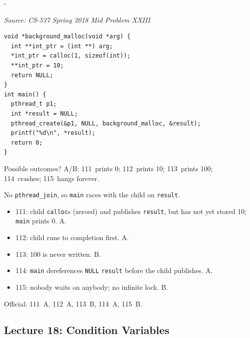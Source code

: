 \documentclass[11pt,a4paper]{article}
\makeatletter
\newcommand{\keepspace}[1]{\par\penalty-100\begingroup
  \setlength{\dimen@}{#1}\dimen@ii\pagegoal\advance\dimen@ii-\pagetotal
  \ifdim\dimen@>\dimen@ii\ifdim\dimen@ii>\z@\vfil\fi\break\fi\endgroup}
\newcounter{qn}[section]
\newenvironment{Qn}[4]{%
  \refstepcounter{qn}\keepspace{7\baselineskip}%
  \begin{tcolorbox}[qboxstyle, title={Q\thesection.\theqn\ \ [#1 \textbar\ #2]\ \ #4}]%
  {\footnotesize\color{g3}\textit{Source: #3}}\par\smallskip%
}{%
  \end{tcolorbox}%
}
\newenvironment{Sol}{%
  \begin{tcolorbox}[sboxstyle, title={Solution}]%
}{%
  \end{tcolorbox}\vspace{0.35em}%
}
\makeatother
\begin{document}
\begin{Qn}{Medium-Hard}{Lect 16}{CS-537 Spring 2018 Mid Problem XXIII}{Background \texttt{calloc} without a join}
\begin{lstlisting}[numbers=none]
void *background_malloc(void *arg) {
  int **int_ptr = (int **) arg;
  *int_ptr = calloc(1, sizeof(int));
  **int_ptr = 10;
  return NULL;
}
int main() {
  pthread_t p1;
  int *result = NULL;
  pthread_create(&p1, NULL, background_malloc, &result);
  printf("%d\n", *result);
  return 0;
}
\end{lstlisting}

Possible outcomes? A/B: 111~prints 0; 112~prints 10; 113~prints 100; 114~crashes; 115~hangs forever.
\end{Qn}
\begin{Sol}
No \texttt{pthread\_join}, so \texttt{main} races with the child on \texttt{result}.

\begin{itemize}
\item 111: child \texttt{calloc}s (zeroed) and publishes \texttt{result}, but has not yet stored 10; \texttt{main} prints 0. A.
\item 112: child runs to completion first. A.
\item 113: 100 is never written. B.
\item 114: \texttt{main} dereferences \texttt{NULL} \texttt{result} before the child publishes. A.
\item 115: nobody waits on anybody; no infinite lock. B.
\end{itemize}

Official: 111~A, 112~A, 113~B, 114~A, 115~B.
\end{Sol}

\subsection{Lecture 18: Condition Variables}
\end{document}
